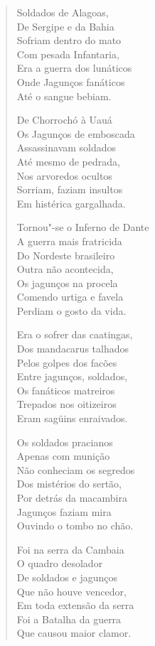 \begin{verse}
Soldados de Alagoas, \\
De Sergipe e da Bahia \\
Sofriam dentro do mato \\
Com pesada Infantaria, \\
Era a guerra dos lunáticos \\
Onde Jagunços fanáticos \\
Até o sangue bebiam. 


De Chorrochó à Uauá \\
Os Jagunços de emboscada \\
Assassinavam soldados \\
Até mesmo de pedrada, \\
Nos arvoredos ocultos \\
Sorriam, faziam insultos \\
Em histérica gargalhada. 

Tornou"-se o Inferno de Dante \\
A guerra mais fratricida \\
Do Nordeste brasileiro \\
Outra não acontecida, \\
Os jagunços na procela \\
Comendo urtiga e favela \\
Perdiam o gosto da vida. 

Era o sofrer das caatingas, \\
Dos mandacarus talhados \\
Pelos golpes dos facões \\
Entre jagunços, soldados, \\
Os fanáticos matreiros \\
Trepados nos oitizeiros \\
Eram sagüins enraivados. 

Os soldados pracianos \\
Apenas com munição \\
Não conheciam os segredos \\
Dos mistérios do sertão, \\
Por detrás da macambira \\
Jagunços faziam mira \\
Ouvindo o tombo no chão. 


Foi na serra da Cambaia \\
O quadro desolador \\
De soldados e jagunços \\
Que não houve vencedor, \\
Em toda extensão da serra \\
Foi a Batalha da guerra \\
Que causou maior clamor. 


\end{verse}
